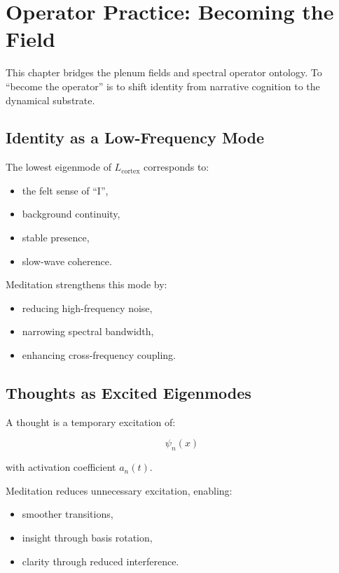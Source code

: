 \documentclass[12pt]{article}
\begin{document}
\chapter{Operator Practice: Becoming the Field}

This chapter bridges the plenum fields and spectral operator ontology.  
To ``become the operator'' is to shift identity from narrative cognition to the
dynamical substrate.

\section{Identity as a Low-Frequency Mode}

The lowest eigenmode of $L_{\text{cortex}}$ corresponds to:

\begin{itemize}
    \item the felt sense of ``I'',
    \item background continuity,
    \item stable presence,
    \item slow-wave coherence.
\end{itemize}

Meditation strengthens this mode by:

\begin{itemize}
    \item reducing high-frequency noise,
    \item narrowing spectral bandwidth,
    \item enhancing cross-frequency coupling.
\end{itemize}

\section{Thoughts as Excited Eigenmodes}

A thought is a temporary excitation of:

\[
\psi_n(x)
\]

with activation coefficient $a_n(t)$.

Meditation reduces unnecessary excitation, enabling:

\begin{itemize}
    \item smoother transitions,
    \item insight through basis rotation,
    \item clarity through reduced interference.
\end{itemize}
\end{document}
